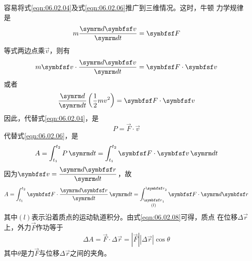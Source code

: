 容易将式\eqref{eqn:06.02.04}及式\eqref{eqn:06.02.06}推广到三维情况。这时，牛顿
力学规律是\vspace{-1.56em}
\begin{equation*}
  m \frac { \dif \vec{ v } } { \dif t } = \vec{F}
\end{equation*}
等式两边点乘$ \vec{ v } $，则有
\begin{equation*}
  m \vec{v} \cdot \frac { \dif \vec{v} } { \dif t } = \vec{F} \cdot \vec{v}
\end{equation*}
或者\vspace{-1.56em}
\begin{equation*}
  \frac { \dif } { \dif t } \left( \frac { 1 } { 2 } m v ^ { 2 } \right) = \vec{F} \cdot \vec{v}
\end{equation*}
因此，代替式\eqref{eqn:06.02.04}，是
\begin{equation}\label{eqn:06.02.07}
  P = \vec{F} \cdot \vec{v}
\end{equation}
代替式\eqref{eqn:06.02.06}，是
\begin{equation*}
  A = \int _ { t _ { 1 } } ^ { t _ { 2 } } P \dif t = \int _ { t _ { 1 } } ^ { t _ { 2 } } \vec{F} \cdot \vec{v} \dif t
\end{equation*}
因为$ \vec{ v } = \dfrac { \dif \vec{ r } } { \dif t } $，故
\begin{equation}\label{eqn:06.02.08}
  A = \int _ { t _ { 1 } } ^ { t _ { 2 } } \vec{ F } \cdot \frac { \dif \vec { r } } { \dif t } \dif t = \mathop{\int _ { \vec{r} _ { 1 } } ^ { \vec{r} _ { 2 } }}\limits _ { ( l ) } \vec{F} \cdot \dif \vec{r}
\end{equation}
其中$ (l) $表示沿着质点的运动轨道积分。由式\eqref{eqn:06.02.08}可得，质点
在位移$ \Delta \vec{r} $上，外力$ \vec{F} $作功等于
\begin{equation}\label{eqn:06.02.09}
  \Delta A = \vec{F} \cdot \Delta \vec{r} = |\vec{F}| |\Delta \vec{r}| \cos \theta
\end{equation}
其中$ \theta $是力$ \vec{F} $与位移$ \Delta \vec{r} $之间的夹角。